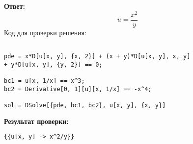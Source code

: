 \documentclass[a4paper,12pt]{article}
\begin{document}
    \textbf{Ответ:}
    $$u =\frac{x^2}{y}$$
    Код для проверки решения:
    \begin{lstlisting}
        
pde = x*D[u[x, y], {x, 2}] + (x + y)*D[u[x, y], x, y] 
+ y*D[u[x, y], {y, 2}] == 0;

bc1 = u[x, 1/x] == x^3;
bc2 = Derivative[0, 1][u][x, 1/x] == -x^4;

sol = DSolve[{pde, bc1, bc2}, u[x, y], {x, y}]

    \end{lstlisting}

\textbf{Результат проверки:}
\begin{lstlisting}
{{u[x, y] -> x^2/y}}
\end{lstlisting}
\end{document}
